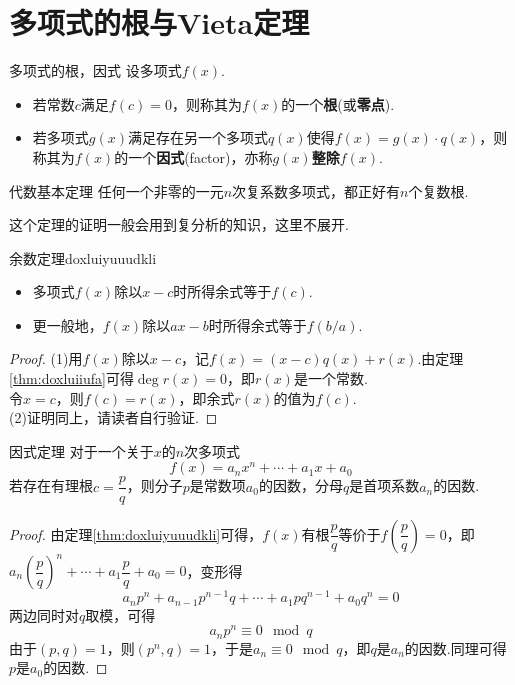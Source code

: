 \documentclass[lang=cn, zihao=5]{elegantbook}
\newcommand{\ssb}[1]{\left( #1 \right)}
\begin{document}
\section{多项式的根与Vieta定理}

\begin{definition}{多项式的根，因式}
	设多项式$f(x)$.
	\begin{itemize}
		\item 若常数$c$满足$f(c)=0$，则称其为$f(x)$的一个\textbf{根}(或\textbf{零点}).
		\item 若多项式$g(x)$满足存在另一个多项式$q(x)$使得$f(x)=g(x) \cdot q(x)$，则称其为$f(x)$的一个\textbf{因式}(factor)，亦称$g(x)$\textbf{整除}$f(x)$.
	\end{itemize}
\end{definition}

\begin{theorem}{代数基本定理}
	任何一个非零的一元$n$次复系数多项式，都正好有$n$个复数根.
\end{theorem}
\begin{remark}
	这个定理的证明一般会用到复分析的知识，这里不展开.
\end{remark}

\begin{theorem}{余数定理}{doxluiyuuudkli}
	\begin{itemize}
		\item 多项式$f(x)$除以$x-c$时所得余式等于$f(c)$.
		\item 更一般地，$f(x)$除以$ax-b$时所得余式等于$f(b/a)$.
	\end{itemize}
\end{theorem}
\begin{proof}
	(1)用$f(x)$除以$x-c$，记$f(x)=(x-c)q(x)+r(x)$.由定理\ref{thm:doxluiiufa}可得$\deg r(x) =0$，即$r(x)$是一个常数. \\
	令$x=c$，则$f(c)=r(x)$，即余式$r(x)$的值为$f(c)$. \\
	(2)证明同上，请读者自行验证.
\end{proof}

\begin{theorem}{因式定理}
    对于一个关于$x$的$n$次多项式$$f(x)=a_nx^n+ \cdots +a_1x+a_0$$若存在有理根$c=\dfrac{p}{q}$，则分子$p$是常数项$a_0$的因数，分母$q$是首项系数$a_n$的因数.
\end{theorem}
\begin{proof}
	由定理\ref{thm:doxluiyuuudkli}可得，$f(x)$有根$\dfrac{p}{q}$等价于$f\ssb{\dfrac{p}{q}}=0$，即
	$a_n \ssb{\dfrac{p}{q}}^n + \cdots + a_1 \dfrac{p}{q} + a_0 = 0$，变形得
	$$a_np^n + a_{n-1}p^{n-1}q + \cdots + a_1pq^{n-1} + a_0q^n = 0$$
	两边同时对$q$取模，可得$$a_np^n \equiv 0 \mod q$$
	由于$(p,q)=1$，则$(p^n,q)=1$，于是$a_n \equiv 0 \mod q$，即$q$是$a_n$的因数.同理可得$p$是$a_0$的因数.
\end{proof}
\end{document}
